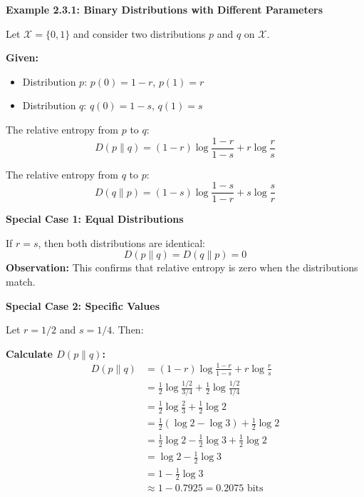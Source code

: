 \documentclass[11pt,a4paper]{book}
\newenvironment{formulabox}[1][Formula]{
    \begin{tcolorbox}[
        enhanced,
        breakable,
        colback=softcoral!10,
        colframe=softcoral!200,
        title=#1,
        fonttitle=\bfseries,
        coltitle=white,
        sharp corners,
        boxrule=1pt,
        left=8pt,
        right=8pt,
        top=6pt,
        bottom=6pt
    ]
}{
    \end{tcolorbox}
}
\newcounter{qna}[chapter]
\renewcommand{\theqna}{\thechapter.\arabic{qna}}
\newenvironment{questionanswerbox}{
    \refstepcounter{qna}%
    \begin{tcolorbox}[
        enhanced,
        breakable,
        colback=softlavender!10,
        colframe=softlavender!200,
        title={Example~\theqna}, %
        fonttitle=\bfseries,
        coltitle=white,
        colbacktitle=softlavender!200,
        sharp corners,
        boxrule=1pt,
        left=8pt,
        right=8pt,
        top=6pt,
        bottom=6pt
    ]
}{
    \end{tcolorbox}
}
\begin{document}
\begin{questionanswerbox}
    \textbf{Example 2.3.1: Binary Distributions with Different Parameters}

    Let \(\mathcal{X} = \{0, 1\}\) and consider two distributions \(p\) and \(q\) on \(\mathcal{X}\).

    \textbf{Given:}
    \begin{itemize}
        \item Distribution \(p\): \(p(0) = 1-r\), \(p(1) = r\)
        \item Distribution \(q\): \(q(0) = 1-s\), \(q(1) = s\)
    \end{itemize}

    \begin{formulabox}[General Formulas]

        The relative entropy from \(p\) to \(q\):
        \[
            D(p \| q) = (1-r) \log \frac{1-r}{1-s} + r \log \frac{r}{s}
        \]

        The relative entropy from \(q\) to \(p\):
        \[
            D(q \| p) = (1-s) \log \frac{1-s}{1-r} + s \log \frac{s}{r}
        \]
    \end{formulabox}

    \hrulefill

    \textbf{Special Case 1: Equal Distributions}

    If \(r = s\), then both distributions are identical:
    \[
        D(p \| q) = D(q \| p) = 0
    \]
    \textbf{Observation:} This confirms that relative entropy is zero when the distributions match.

    \hrulefill

    \textbf{Special Case 2: Specific Values}

    Let \(r = 1/2\) and \(s = 1/4\). Then:

    \textbf{Calculate \(D(p \| q)\):}
    \begin{align*}
        D(p \| q) & = (1-r) \log \frac{1-r}{1-s} + r \log \frac{r}{s}                     \\
                  & = \frac{1}{2} \log \frac{1/2}{3/4} + \frac{1}{2} \log \frac{1/2}{1/4} \\
                  & = \frac{1}{2} \log \frac{2}{3} + \frac{1}{2} \log 2                   \\
                  & = \frac{1}{2} \left(\log 2 - \log 3\right) + \frac{1}{2} \log 2       \\
                  & = \frac{1}{2} \log 2 - \frac{1}{2} \log 3 + \frac{1}{2} \log 2        \\
                  & = \log 2 - \frac{1}{2} \log 3                                         \\
                  & = 1 - \frac{1}{2} \log 3                                              \\
                  & \approx 1 - 0.7925 = 0.2075 \text{ bits}
    \end{align*}


\end{questionanswerbox}
\end{document}
